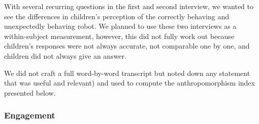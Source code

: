\documentclass{sig-alternate}
\newcommand{\eg}{{\textit{e.g.~}}}
\begin{document}
With several recurring questions in the first and second interview, we wanted to
see the differences in children's perception of the correctly behaving and
unexpectedly behaving robot. We planned to use these two interviews as a
within-subject measurement, however, this did not fully work out because
children's responses were not always accurate, not comparable one by one, and
children did not always give an answer.	



We did not craft a full word-by-word transcript but
noted down any statement that was useful and relevant) and used to compute the
anthropomorphism index presented below.

\subsubsection{Engagement}

%
%
\end{document}
